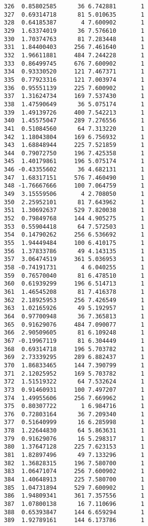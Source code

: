 \documentclass[
  letterpaper,
  DIV=11,
  numbers=noendperiod]{scrreprt}
\begin{document}
\begin{verbatim}
326  0.85802585      36 6.742881       1
327  0.69314718      81 5.010635       1
328  0.64185387       4 7.600902       1
329  1.63374019      36 7.576610       1
330  1.70374763      81 7.283448       1
331  1.84400403     256 7.461640       1
332  1.96611881     484 7.244228       1
333  0.86499745     676 7.600902       1
334  0.93330520     121 7.467371       1
335  0.77923316     121 7.003974       1
336  0.95551139     225 7.600902       1
337  1.31624734     169 7.537430       1
338  1.47590649      36 5.075174       1
339  1.49139726     400 7.542213       1
340  1.45575047     289 7.276556       1
341  0.51084560      64 7.313220       1
342  1.18043804     169 6.756932       1
343  1.68848944     225 7.521859       1
344  0.79072750     196 7.425358       1
345  1.40179861     196 5.075174       1
346 -0.43355602      36 4.682131       1
347  1.68317151     576 7.460490       1
348 -1.76667666     100 7.064759       1
349  3.15559506       4 2.708050       1
350  2.25952101      81 7.643962       1
351  1.30692637     529 7.820038       1
352  0.79849768     144 4.905275       1
353  0.55904418      64 7.572503       1
354  0.14790262     256 6.536692       1
355  1.94449484     100 6.410175       1
356  1.37833786      49 4.143135       1
357  3.06474519     361 5.036953       1
358 -0.74191731       4 6.040255       1
359  0.76570040      81 6.478510       1
360  0.61939299     196 6.514713       1
361  1.46545208      81 7.416378       1
362  2.18925953     256 7.426549       1
363  1.02165926      49 5.192957       1
364  0.97700948      36 7.365813       1
365  0.91629076     484 7.090077       1
366  2.90509605      81 6.109248       1
367 -0.19967119      81 6.304449       1
368  0.69314718     196 5.703782       1
369  2.73339295     289 6.882437       1
370  1.86833465     144 7.390799       1
371  2.12025952     169 5.703782       1
372  1.51519322      64 7.532624       1
373  0.91460931     100 7.497207       1
374  1.49955606     256 7.669962       1
375  0.80307722       1 6.984716       1
376  0.72803164      36 7.209340       1
377  0.51640999      16 6.285998       1
378  1.22644830      64 5.863631       1
379  0.91629076      16 5.298317       1
380  1.37647128     225 7.623153       1
381  1.82897496      49 7.133296       1
382  1.36828315     196 7.580700       1
383  1.06471074     256 7.600902       1
384  1.40648913     225 7.580700       1
385  1.04731894     529 7.600902       1
386  1.94809341     361 7.357556       1
387  1.07800138      16 7.110696       1
388  0.65393847     144 6.659294       1
389  1.92789161     144 6.173786       1

\end{verbatim}
\end{document}
